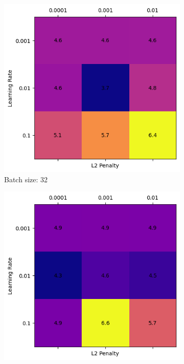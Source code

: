 \documentclass{article}
\begin{document}
\begin{enumerate}[leftmargin=\labelsep,resume]
\begin{figure}[H]
  \centering
  \begin{subfigure}{0.3\linewidth}
      \centering
      \includegraphics[width=\linewidth]{img/7_colorplot_32.png}
      \caption{Batch size: 32}
  \end{subfigure}
  \hfill %
  \begin{subfigure}{0.3\linewidth}
      \centering
      \includegraphics[width=\linewidth]{img/7_colorplot_64.png}

\end{subfigure}
\end{figure}
\end{enumerate}
\end{document}
